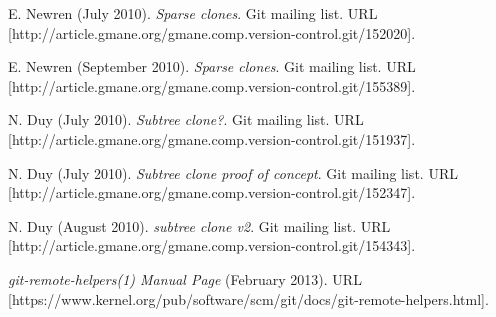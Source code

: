 \documentclass[preprint]{sigplanconf}
\begin{document}
\begin{thebibliography}{10}
    E. Newren (July 2010).
    \newblock \emph{Sparse clones}.
    \newblock Git mailing list.
    \newblock URL
    [http://article.gmane.org/gmane.comp.version-control.git/152020].

    E. Newren (September 2010).
    \newblock \emph{Sparse clones}.
    \newblock Git mailing list.
    \newblock URL
    [http://article.gmane.org/gmane.comp.version-control.git/155389].

    N. Duy (July 2010).
    \newblock \emph{Subtree clone?}.
    \newblock Git mailing list.
    \newblock URL
    [http://article.gmane.org/gmane.comp.version-control.git/151937].

    N. Duy (July 2010).
    \newblock \emph{Subtree clone proof of concept}.
    \newblock Git mailing list.
    \newblock URL
    [http://article.gmane.org/gmane.comp.version-control.git/152347].

    N. Duy (August 2010).
    \newblock \emph{subtree clone v2}.
    \newblock Git mailing list.
    \newblock URL
    [http://article.gmane.org/gmane.comp.version-control.git/154343].

     \emph{git-remote-helpers(1) Manual Page}
        (February 2013).
    \newblock URL
    [https://www.kernel.org/pub/software/scm/git/docs/git-remote-helpers.html].
\end{thebibliography}
\end{document}

